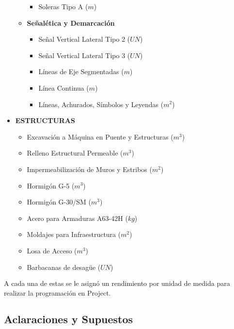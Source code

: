 \begin{itemize}
\begin{itemize}
\begin{itemize}
            \item Soleras Tipo A ($m$)
        \end{itemize}
        \item \textbf{Señalética y Demarcación}
        \begin{itemize}
            \item Señal Vertical Lateral Tipo 2 ($UN$)
            \item Señal Vertical Lateral Tipo 3 ($UN$)
            \item Líneas de Eje Segmentadas ($m$)
            \item Línea Continua ($m$)
            \item Líneas, Achurados, Símbolos y Leyendas ($m^2$)
        \end{itemize}
    \end{itemize}
    \item \textbf{ESTRUCTURAS}
    \begin{itemize}
        \item Excavación a Máquina en Puente y Estructuras ($m^3$)
        \item Relleno Estructural Permeable ($m^3$)
        \item Impermeabilización de Muros y Estribos ($m^2$)
        \item Hormigón G-5 ($m^3$)
        \item Hormigón G-30/SM ($m^3$)
        \item Acero para Armaduras A63-42H ($kg$)
        \item Moldajes para Infraestructura ($m^2$)
        \item Losa de Acceso ($m^3$)
        \item Barbacanas de desagüe ($UN$)
    \end{itemize}
\end{itemize}
\vspace{1cm}
A cada una de estas se le asignó un rendimiento por unidad de medida para realizar la programación en Project.
\\
\subsection{Aclaraciones y Supuestos}

